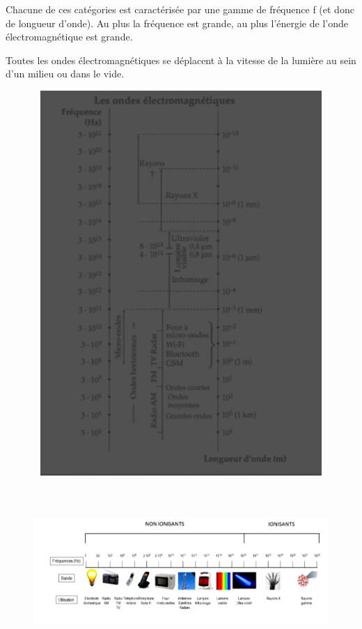 Chacune de ces catégories est caractérisée par une gamme de fréquence f
(et donc de longueur d'onde). Au plus la fréquence est grande, au plus
l'énergie de l'onde électromagnétique est grande.

Toutes les ondes électromagnétiques se déplacent à la vitesse de la
lumière au sein d'un milieu ou dans le vide.

\begin{figure}
\centering
\includegraphics[width=11.425cm,height=14.616cm]{Pictures/1000000100000147000001C0C9C8D746CD882C9F.png}
\caption{}
\end{figure}

\begin{figure}
\centering
\includegraphics[width=17.233cm,height=6.184cm]{Pictures/100000010000037D0000014014F58CF6D7F0CE8B.png}
\caption{}
\end{figure}

